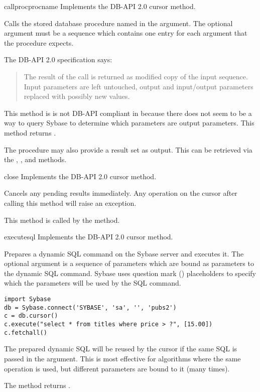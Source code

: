 \begin{methoddesc}[Cursor]{callproc}{procname }
Implements the DB-API 2.0 cursor  method.

Calls the stored database procedure named in the 
argument. The optional  argument must be a sequence
which contains one entry for each argument that the procedure expects.

The DB-API 2.0 specification says:

\begin{quote}
The result of the call is returned as modified copy of the input
sequence.  Input parameters are left untouched, output and
input/output parameters replaced with possibly new values.
\end{quote}

This method is is not DB-API compliant in because there does not seem
to be a way to query Sybase to determine which parameters are output
parameters.  This method returns .

The procedure may also provide a result set as output. This can be
retrieved via the , , and
 methods.
\end{methoddesc}

\begin{methoddesc}[Cursor]{close}{}
Implements the DB-API 2.0 cursor  method.

Cancels any pending results immediately.  Any operation on the cursor
after calling this method will raise an exception.

This method is called by the  method.
\end{methoddesc}

\begin{methoddesc}[Cursor]{execute}{sql }
Implements the DB-API 2.0 cursor  method.

Prepares a dynamic SQL command on the Sybase server and executes it.
The optional  argument is a sequence of parameters which
are bound as parameters to the dynamic SQL command.  Sybase uses
question mark () placeholders to specify which the parameters
will be used by the SQL command.

\begin{verbatim}
import Sybase
db = Sybase.connect('SYBASE', 'sa', '', 'pubs2')
c = db.cursor()
c.execute("select * from titles where price > ?", [15.00])
c.fetchall()
\end{verbatim}

The prepared dynamic SQL will be reused by the cursor if the same SQL
is passed in the  argument.  This is most effective for
algorithms where the same operation is used, but different parameters
are bound to it (many times).

The method returns .
\end{methoddesc}

